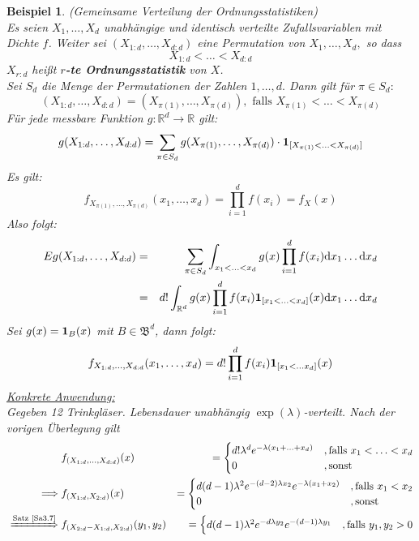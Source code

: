 \documentclass[a4paper,11pt]{book}
\newcommand{\R}{{\mathbb R}}
\newcommand{\ind}{\text{\bf{1}}}
\def\BB{ \mathfrak{B} }
\def\folgt{\ensuremath{\implies}}
\newcommand{\folgtnach}[1]{\ensuremath{\DOTSB\;\xRightarrow{\text{#1}}\;}}
\def\d{\mbox{d}}
\newtheorem{Bsp}{Beispiel}[chapter]
\theoremstyle{nonumberplain}
\begin{document}
\begin{Bsp} \label{Bsp3.5} (Gemeinsame Verteilung der Ordnungsstatistiken)\\
Es seien $X_1,\ldots,X_d$ unabhängige und identisch verteilte Zufallsvariablen mit Dichte $f$. Weiter sei $(X_{1:d}, \ldots, X_{d:d})$ eine Permutation von $X_1, \ldots,X_d,$ so dass
$$X_{1:d}<\ldots<X_{d:d}$$
$X_{r:d}$ heißt \textbf{$r$-te Ordnungsstatistik}  von $X$.\\
Sei $S_d$ die Menge der Permutationen der Zahlen $1,\ldots, d.$ Dann gilt für $\pi\in S_d:$
$$(X_{1:d},\ldots,X_{d:d})=(X_{\pi(1)},\ldots, X_{\pi(d)}), \text{ falls } X_{\pi(1)}<\ldots<X_{\pi(d)}$$
Für jede messbare Funktion $g:\R^d\to\R$ gilt:
$$g(X_{1:d},\ldots,X_{d:d})=\sum_{\pi\in S_d}g(X_{\pi(1)},\ldots,X_{\pi(d)})\cdot\ind_{[X_{\pi(1)}<\ldots<X_{\pi(d)}]}$$
Es gilt:
$$f_{X_{\pi(1)},\ldots,X_{\pi(d)}}(x_1,\ldots,x_d)=\prod_{i=1}^d f(x_i) = f_X(x)$$
Also folgt:
\begin{eqnarray*}
Eg(X_{1:d},\ldots,X_{d:d})&=&\sum_{\pi\in S_d}\int_{x_1<\ldots<x_d} g(x)\prod_{i=1}^d f(x_i)\d x_1\ldots\d x_d\\
&=&d!\int_{\R^d}g(x)\prod_{i=1}^d f(x_i)\ind_{[x_1<\ldots<x_d]}(x)\d x_1\ldots\d x_d\\
\end{eqnarray*}
Sei $g(x)=\ind_B(x)$ mit $B\in\BB^d$, dann folgt:
$$f_{X_{1:d},\ldots,X_{d:d}}(x_1,\ldots,x_d)=d!\prod_{i=1}^d f(x_i)\ind_{[x_1<\ldots x_d]}(x)$$
\underline{Konkrete Anwendung:}\\
Gegeben 12 Trinkgläser. Lebensdauer unabhängig $\exp(\lambda)$-verteilt. Nach der vorigen Überlegung gilt
\begin{eqnarray*}
&f_{(X_{1:d},\ldots,X_{d:d})}(x)&=\begin{cases}
d!\lambda^d e^{-\lambda(x_1+\ldots+x_d)} &,\text{falls } x_1<\ldots<x_d\\
0&,\text{sonst}
\end{cases}\\
\folgt&f_{(X_{1:d},X_{2:d})}(x)&=\begin{cases}
d(d-1)\lambda^2 e^{-(d-2)\lambda x_2} e^{-\lambda(x_1+x_2)} &,\text{falls } x_1<x_2\\
0&,\text{sonst}
\end{cases}\\
\folgtnach{Satz \ref{Sa3.7}}&f_{(X_{2:d}-X_{1:d},X_{2:d})}(y_1,y_2)&=\begin{cases}
d(d-1)\lambda^2 e^{-d\lambda y_2} e^{-(d-1)\lambda y_1} &,\text{falls } y_1,y_2>0\\

\end{cases}
\end{eqnarray*}
\end{Bsp}
\end{document}
